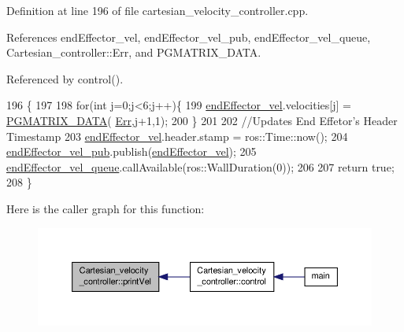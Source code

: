 Definition at line 196 of file cartesian\-\_\-velocity\-\_\-controller.\-cpp.



References end\-Effector\-\_\-vel, end\-Effector\-\_\-vel\-\_\-pub, end\-Effector\-\_\-vel\-\_\-queue, Cartesian\-\_\-controller\-::\-Err, and P\-G\-M\-A\-T\-R\-I\-X\-\_\-\-D\-A\-T\-A.



Referenced by control().


\begin{DoxyCode}
196                                                    \{
197 
198         \textcolor{keywordflow}{for}(\textcolor{keywordtype}{int} j=0;j<6;j++)\{
199                 \hyperlink{classCartesian__velocity__controller_ae771d963a90ad7b844c4c3a821ce5f39}{endEffector\_vel}.velocities[j] = \hyperlink{gmatrix_8h_a7333180c47234295df2bd7b09ac00da8}{PGMATRIX\_DATA}(
      \hyperlink{classCartesian__controller_ab3f08ecf10cb2486e8bfc61f07e2bde6}{Err},j+1,1);
200         \}
201 
202         \textcolor{comment}{//Updates End Effetor's Header Timestamp}
203         \hyperlink{classCartesian__velocity__controller_ae771d963a90ad7b844c4c3a821ce5f39}{endEffector\_vel}.header.stamp = ros::Time::now();
204         \hyperlink{classCartesian__velocity__controller_ab12287816ae785d3cd6243b3df0cffc6}{endEffector\_vel\_pub}.publish(\hyperlink{classCartesian__velocity__controller_ae771d963a90ad7b844c4c3a821ce5f39}{endEffector\_vel});
205         \hyperlink{classCartesian__velocity__controller_af154b0cda931081b52224eb22e4680f7}{endEffector\_vel\_queue}.callAvailable(ros::WallDuration(0));
206 
207         \textcolor{keywordflow}{return} \textcolor{keyword}{true};
208 \}
\end{DoxyCode}


Here is the caller graph for this function\-:\nopagebreak
\begin{figure}[H]
\begin{center}
\leavevmode
\includegraphics[width=350pt]{classCartesian__velocity__controller_ad5dbfc4b8ec4fad7bca9b9a4fd9358b4_icgraph}
\end{center}
\end{figure}



